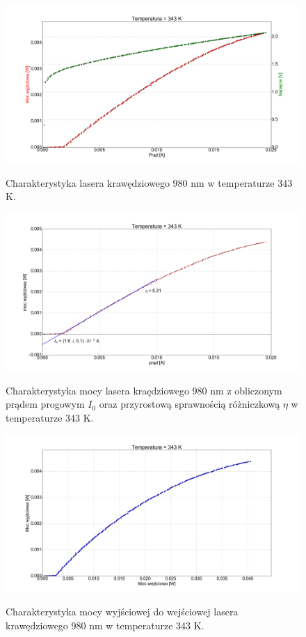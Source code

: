 \documentclass[a4paper, portrait,12pt]{report}
\begin{document}
\begin{figure}
\center
  \includegraphics[scale=0.30]{plot980/temp_70_IVL.png}
  \label{rys1}
  \caption{Charakterystyka lasera krawędziowego 980 nm w temperaturze 343 K.} 
\end{figure}


\begin{figure}
\center
  \includegraphics[scale=0.30]{plot980/temp_70_fit.png}
  \label{rys1}
  \caption{Charakterystyka mocy lasera kraędziowego 980 nm z obliczonym prądem progowym $I_0$ oraz przyrostową sprawnością różniczkową $\eta$ w temperaturze 343 K.} 
\end{figure}

\begin{figure}
\center
  \includegraphics[scale=0.30]{plot980/temp_70_power.png}
  \label{rys1}
  \caption{Charakterystyka mocy wyjściowej do wejściowej lasera krawędziowego 980 nm w temperaturze 343 K.} 
\end{figure}
\end{document}
